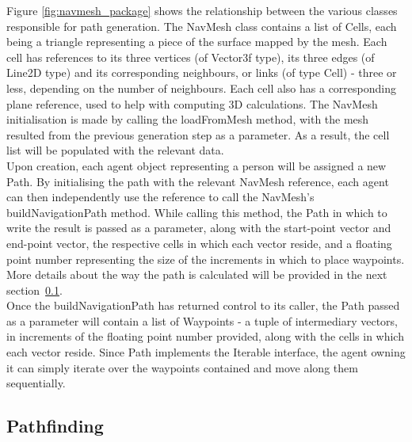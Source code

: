 Figure \ref{fig:navmesh_package} shows the relationship between the various classes responsible for path generation. The NavMesh class contains a list of Cells, each being a triangle representing a piece of the surface mapped by the mesh. Each cell has references to its three vertices (of Vector3f type), its three edges (of Line2D type) and its corresponding neighbours, or links (of type Cell) - three or less, depending on the number of neighbours. Each cell also has a corresponding plane reference, used to help with computing 3D calculations.
The NavMesh initialisation is made by calling the loadFromMesh method, with the mesh resulted from the previous generation step as a parameter. As a result, the cell list will be populated with the relevant data. \\
Upon creation, each agent object representing a person will be assigned a new Path. By initialising the path with the relevant NavMesh reference, each agent can then independently use the reference to call the NavMesh's buildNavigationPath method. While calling this method, the Path in which to write the result is passed as a parameter, along with the start-point vector and end-point vector, the respective cells in which each vector reside, and a floating point number representing the size of the increments in which to place waypoints. More details about the way the path is calculated will be provided in the next section~\ref{pathfinding}. \\
Once the buildNavigationPath has returned control to its caller, the Path passed as a parameter will contain a list of Waypoints - a tuple of intermediary vectors, in increments of the floating point number provided, along with the cells in which each vector reside. Since Path implements the Iterable interface, the agent owning it can simply iterate over the waypoints contained and move along them sequentially.

\subsection{Pathfinding}
\label{pathfinding}

